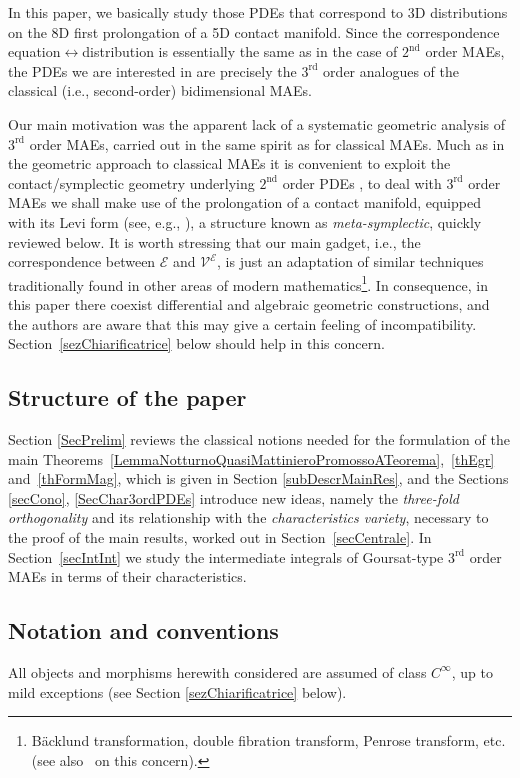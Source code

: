 \documentclass[10pt,a4paper]{amsart}
\newcommand{\M}{\mathcal{V}}
\newcommand{\E}{\mathcal{E}}
\newcommand{\Rd}{^\textrm{rd}}
\newcommand{\Nd}{^\textrm{nd}}
\numberwithin{equation}{section}
\begin{document}
In this paper, we basically
study those PDEs that correspond to 3D distributions on the 8D f\/irst prolongation of a 5D contact manifold.
Since the correspondence equation$\leftrightarrow$distribution is essentially the same as in the case of $2\Nd$ order MAEs, the PDEs we are interested in are precisely the $3\Rd$ order analogues
 of the classical (i.e., second-order) bidimensional MAEs.

Our main motivation was the apparent lack of a systematic geometric analysis of $3\Rd$ order MAEs,
carried out in the same spirit as for classical MAEs. Much as in the geometric approach to classical MAEs it is convenient to exploit the contact/symplectic geometry underlying $2\Nd$ order PDEs \cite{MR2383541, MR2503974,MR2805306,MR2352610,MR781584,MR1458653}, to deal with $3\Rd$ order MAEs we shall make use of the prolongation of a contact manifold, equipped with its Levi form (see, e.g., \cite[Section~2]{MR2279499}), a structure known as \emph{meta-symplectic}, quickly reviewed below. It is worth stressing that our main gadget, i.e., the correspondence between $\E$ and $\M^\E$, is just an adaptation of similar techniques traditionally found in other areas of modern mathematics\footnote{B\"acklund transformation, double f\/ibration transform, Penrose transform, etc. (see also~\cite{138544} on this concern).}.
In consequence, in this paper there coexist dif\/ferential and algebraic geometric constructions, and the authors are aware that this may give a certain feeling of incompatibility. Section~\ref{sezChiarificatrice} below should help in this concern.

\subsection*{Structure of the paper}
Section \ref{SecPrelim} reviews the classical notions needed for the formulation of the main Theo\-rems~\ref{LemmaNotturnoQuasiMattinieroPromossoATeorema},~\ref{thEgr} and~\ref{thFormMag}, which is given in Section \ref{subDescrMainRes}, and the Sections \ref{secCono}, \ref{SecChar3ordPDEs} introduce new ideas, namely the \emph{three-fold orthogonality} and its relationship with the \emph{characteristics variety}, necessary to the proof of the main results, worked out in Section~\ref{secCentrale}.
In Section~\ref{secIntInt} we study the intermediate integrals of Goursat-type $3\Rd$ order MAEs in terms of their characteristics.

\subsection*{Notation and conventions}
All objects and morphisms herewith considered are assumed of class $C^\infty$, up to mild exceptions (see Section \ref{sezChiarificatrice} below).
\end{document}
